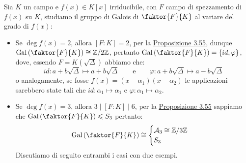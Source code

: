 \documentclass[11pt]{scrartcl}
\begin{document}
\begin{example}
    Sia $K$ un campo e $f(x) \in K[x]$ irriducibile, con $F$ campo di spezzamento di $f(x)$ su $K$, studiamo il gruppo di Galois di $\faktor{F}{K}$ al variare del grado di $f(x)$:
    \begin{itemize}
        \item Se $\deg f(x) = 2$, allora $[F : K] = 2$, per la \hyperref[3.55]{Proposizione 3.55}, dunque $\Gal\left(\faktor{F}{K}\right) \cong \Z{2}$, pertanto $\Gal\left(\faktor{F}{K}\right) = \{id,\varphi\}$, dove, essendo $F = K(\sqrt{\Delta})$ abbiamo che:
        \[ id : a+b\sqrt{\Delta} \longmapsto a+b\sqrt{\Delta} \qquad \text{e} \qquad \varphi : a+b\sqrt{\Delta} \longmapsto a-b\sqrt{\Delta}
            \]
        o analogamente, se fosse $f(x) = (x - \alpha_1)(x - \alpha_2 )$ le applicazioni sarebbero state tali che $id : \alpha_1 \longmapsto \alpha_1$ e $\varphi : \alpha_1 \longmapsto \alpha_2$.
        \item Se $\deg f(x) = 3$, allora $3 \mid [F : K] \mid 6$, per la \hyperref[3.55]{Proposizione 3.55} sappiamo che $\Gal\left(\faktor{F}{K}\right) \leqslant S_3$ pertanto:
        \[ \Gal\left(\faktor{F}{K}\right) \cong \begin{cases}
            \mathcal{A}_3 \cong \Z{3} \\
            S_3
        \end{cases}
            \]
        Discutiamo di seguito entrambi i casi con due esempi.
    \end{itemize}
\end{example}
\end{document}
